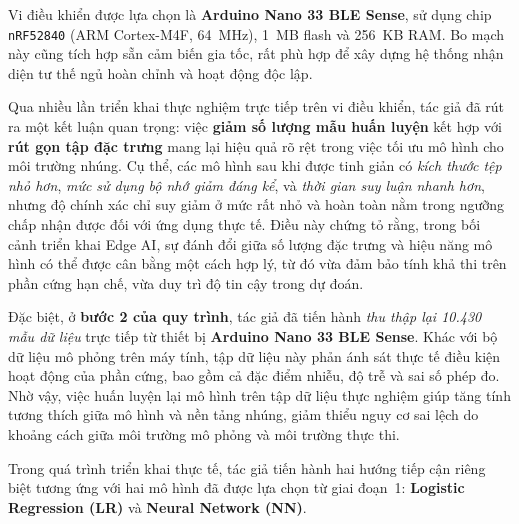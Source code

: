 Vi điều khiển được lựa chọn là \textbf{Arduino Nano 33 BLE Sense}, sử dụng chip \texttt{nRF52840} (ARM Cortex-M4F, 64~MHz), 1~MB flash và 256~KB RAM. Bo mạch này cũng tích hợp sẵn cảm biến gia tốc, rất phù hợp để xây dựng hệ thống nhận diện tư thế ngủ hoàn chỉnh và hoạt động độc lập.


Qua nhiều lần triển khai thực nghiệm trực tiếp trên vi điều khiển, 
tác giả đã rút ra một kết luận quan trọng: 
việc \textbf{giảm số lượng mẫu huấn luyện} kết hợp với \textbf{rút gọn tập đặc trưng} 
mang lại hiệu quả rõ rệt trong việc tối ưu mô hình cho môi trường nhúng. 
Cụ thể, các mô hình sau khi được tinh giản có \emph{kích thước tệp nhỏ hơn}, 
\emph{mức sử dụng bộ nhớ giảm đáng kể}, và \emph{thời gian suy luận nhanh hơn}, 
nhưng độ chính xác chỉ suy giảm ở mức rất nhỏ và hoàn toàn nằm trong ngưỡng chấp nhận được đối với ứng dụng thực tế. 
Điều này chứng tỏ rằng, trong bối cảnh triển khai Edge AI, 
sự đánh đổi giữa số lượng đặc trưng và hiệu năng mô hình có thể được cân bằng một cách hợp lý, 
từ đó vừa đảm bảo tính khả thi trên phần cứng hạn chế, vừa duy trì độ tin cậy trong dự đoán.  

Đặc biệt, ở \textbf{bước 2 của quy trình}, tác giả đã tiến hành \emph{thu thập lại 10.430 mẫu dữ liệu} 
trực tiếp từ thiết bị \textbf{Arduino Nano 33 BLE Sense}. 
Khác với bộ dữ liệu mô phỏng trên máy tính, tập dữ liệu này phản ánh sát thực tế điều kiện hoạt động của phần cứng, 
bao gồm cả đặc điểm nhiễu, độ trễ và sai số phép đo. 
Nhờ vậy, việc huấn luyện lại mô hình trên tập dữ liệu thực nghiệm giúp tăng tính tương thích giữa mô hình và nền tảng nhúng, 
giảm thiểu nguy cơ sai lệch do khoảng cách giữa môi trường mô phỏng và môi trường thực thi.  

Trong quá trình triển khai thực tế, tác giả tiến hành hai hướng tiếp cận riêng biệt 
tương ứng với hai mô hình đã được lựa chọn từ giai đoạn~1: \textbf{Logistic Regression (LR)} và \textbf{Neural Network (NN)}.  

